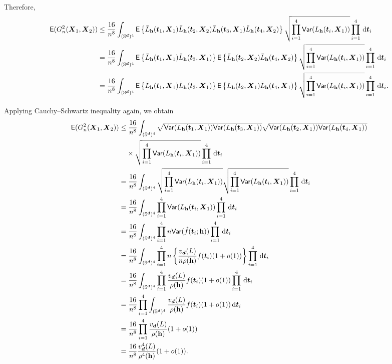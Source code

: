 \documentclass{article}
\begin{document}
Therefore,
\begin{align*}
    \mathsf{E} (G_n^2(\bX_1,\bX_2)) & \le \frac{16}{n^{8}} \int_{(\Sr)^4} \mathsf{E} \lrb{ \bar{L}_{\bh} (\bt_1,\bX_1) \bar{L}_{\bh} (\bt_2,\bX_2) \bar{L}_{\bh} (\bt_3,\bX_1) \bar{L}_{\bh} (\bt_4,\bX_2)} \sqrt{\prod_{i=1}^{4} \mathsf{Var} ({L}_{\bh} (\bt_i,\bX_1)) } \prod_{i=1}^{4} \,\rd \bt_i \\
    &= \frac{16}{n^{8}} \int_{(\Sr)^4} \mathsf{E} \lrb{ \bar{L}_{\bh} (\bt_1,\bX_1) \bar{L}_{\bh} (\bt_3,\bX_1) } \mathsf{E} \lrb{ \bar{L}_{\bh} (\bt_2,\bX_2) \bar{L}_{\bh} (\bt_4,\bX_2)} \sqrt{\prod_{i=1}^{4} \mathsf{Var} ({L}_{\bh} (\bt_i,\bX_1)) } \prod_{i=1}^{4} \,\rd \bt_i \\
    &= \frac{16}{n^{8}} \int_{(\Sr)^4} \mathsf{E} \lrb{ \bar{L}_{\bh} (\bt_1,\bX_1) \bar{L}_{\bh} (\bt_3,\bX_1) } \mathsf{E} \lrb{ \bar{L}_{\bh} (\bt_2,\bX_1) \bar{L}_{\bh} (\bt_4,\bX_1)} \sqrt{\prod_{i=1}^{4} \mathsf{Var} ({L}_{\bh} (\bt_i,\bX_1)) } \prod_{i=1}^{4} \,\rd \bt_i. \\
\end{align*}

Applying Cauchy--Schwartz inequality again, we obtain
\begin{align*}
    \mathsf{E} (G_n^2(\bX_1,\bX_2)) \le &\; \frac{16}{n^{8}} \int_{(\Sr)^4}  \sqrt{\mathsf{Var} ({L}_{\bh} (\bt_1,\bX_1)) \mathsf{Var} ({L}_{\bh} (\bt_3,\bX_1))} \sqrt{\mathsf{Var} ({L}_{\bh} (\bt_2,\bX_1)) \mathsf{Var} ({L}_{\bh} (\bt_4,\bX_1))} \\
    & \times \sqrt{\prod_{i=1}^{4} \mathsf{Var} ({L}_{\bh} (\bt_i,\bX_1)) } \prod_{i=1}^{4} \,\rd \bt_i \\
    =&\; \frac{16}{n^{8}} \int_{(\Sr)^4} \sqrt{\prod_{i=1}^{4} \mathsf{Var} ({L}_{\bh} (\bt_i,\bX_1)) } \sqrt{\prod_{i=1}^{4} \mathsf{Var} ({L}_{\bh} (\bt_i,\bX_1)) } \prod_{i=1}^{4} \,\rd \bt_i \\
    =&\; \frac{16}{n^{8}} \int_{(\Sr)^4} \prod_{i=1}^{4} \mathsf{Var} ({L}_{\bh} (\bt_i,\bX_1)) \prod_{i=1}^{4} \,\rd \bt_i \\
    =&\; \frac{16}{n^{8}} \int_{(\Sr)^4} \prod_{i=1}^{4} n \mathsf{Var} (\hat{f}(\bt_i;\bh)) \prod_{i=1}^{4} \,\rd \bt_i \\
    =&\; \frac{16}{n^{8}} \int_{(\Sr)^4} \prod_{i=1}^{4} n \lrb{\frac{v_{\bd}(L)}{n \rho(\bh)} f(\bt_i)(1 + o(1))} \prod_{i=1}^{4} \,\rd \bt_i \\
    =&\; \frac{16}{n^{8}} \int_{(\Sr)^4} \prod_{i=1}^{4} \frac{v_{\bd}(L)}{ \rho(\bh)} f(\bt_i)(1 + o(1)) \prod_{i=1}^{4} \,\rd \bt_i \\
    =&\; \frac{16}{n^{8}} \prod_{i=1}^{4} \int_{(\Sr)^4} \frac{v_{\bd}(L)}{ \rho(\bh)} f(\bt_i)(1 + o(1)) \,\rd \bt_i \\
    =&\; \frac{16}{n^{8}} \prod_{i=1}^{4} \frac{v_{\bd}(L)}{ \rho(\bh)} (1 + o(1)) \\
    =&\; \frac{16}{n^{8}} \frac{v_{\bd}^4(L)}{ \rho^4(\bh)} (1 + o(1)).
\end{align*}
\end{document}
